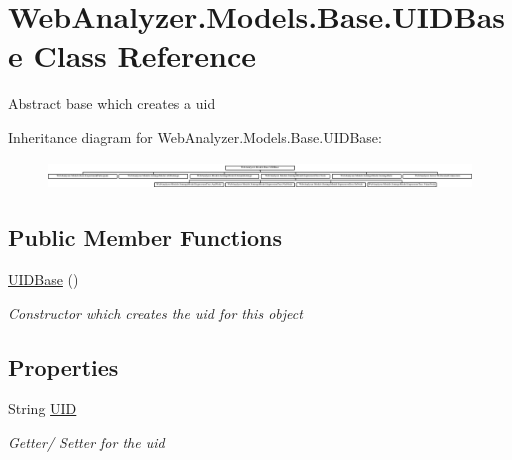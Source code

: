 \hypertarget{class_web_analyzer_1_1_models_1_1_base_1_1_u_i_d_base}{}\section{Web\+Analyzer.\+Models.\+Base.\+U\+I\+D\+Base Class Reference}
\label{class_web_analyzer_1_1_models_1_1_base_1_1_u_i_d_base}


Abstract base which creates a uid  


Inheritance diagram for Web\+Analyzer.\+Models.\+Base.\+U\+I\+D\+Base\+:\begin{figure}[H]
\begin{center}
\leavevmode
\includegraphics[height=0.731071cm]{class_web_analyzer_1_1_models_1_1_base_1_1_u_i_d_base}
\end{center}
\end{figure}
\subsection*{Public Member Functions}
\begin{DoxyCompactItemize}
\item 
\hyperlink{class_web_analyzer_1_1_models_1_1_base_1_1_u_i_d_base_af8ee5eded0b2f646e19b26bf3728fea5}{U\+I\+D\+Base} ()
\begin{DoxyCompactList}\small\item\em Constructor which creates the uid for this object \end{DoxyCompactList}\end{DoxyCompactItemize}
\subsection*{Properties}
\begin{DoxyCompactItemize}
\item 
String \hyperlink{class_web_analyzer_1_1_models_1_1_base_1_1_u_i_d_base_a4ed4a066c028bebd3eb39175965c7d81}{U\+I\+D}
\begin{DoxyCompactList}\small\item\em Getter/ Setter for the uid \end{DoxyCompactList}\end{DoxyCompactItemize}
